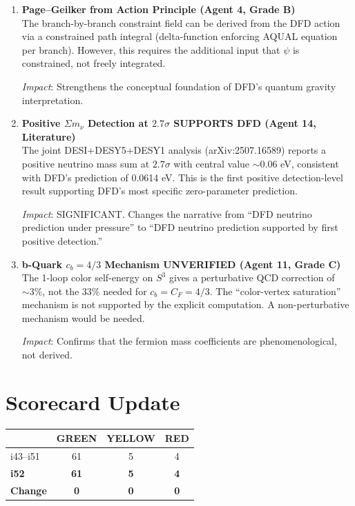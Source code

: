 \documentclass[11pt,a4paper]{article}
\newcommand{\GREEN}{\textcolor{dfdgreen}{\textbf{GREEN}}}
\newcommand{\YELLOW}{\textcolor{dfdyellow}{\textbf{YELLOW}}}
\newcommand{\RED}{\textcolor{dfdred}{\textbf{RED}}}
\begin{document}
\begin{enumerate}[label=\textbf{\arabic*.}, leftmargin=1.5cm]
\textit{Impact}: If SO confirms $\beta \neq 0$ at $>5\sigma$, the DFD microsector requires modification. Core theory unaffected.

\item \textbf{Page--Geilker from Action Principle (Agent 4, Grade B)}\\
The branch-by-branch constraint field can be derived from the DFD action via a constrained path integral (delta-function enforcing AQUAL equation per branch). However, this requires the additional input that $\psi$ is constrained, not freely integrated.

\textit{Impact}: Strengthens the conceptual foundation of DFD's quantum gravity interpretation.

\item \textbf{Positive $\Sigma m_\nu$ Detection at $2.7\sigma$ SUPPORTS DFD (Agent 14, Literature)}\\
The joint DESI+DESY5+DESY1 analysis (arXiv:2507.16589) reports a positive neutrino mass sum at $2.7\sigma$ with central value $\sim 0.06$ eV, consistent with DFD's prediction of 0.0614 eV. This is the first positive detection-level result supporting DFD's most specific zero-parameter prediction.

\textit{Impact}: SIGNIFICANT. Changes the narrative from ``DFD neutrino prediction under pressure'' to ``DFD neutrino prediction supported by first positive detection.''

\item \textbf{b-Quark $c_b = 4/3$ Mechanism UNVERIFIED (Agent 11, Grade C)}\\
The 1-loop color self-energy on $S^3$ gives a perturbative QCD correction of $\sim 3\%$, not the $33\%$ needed for $c_b = C_F = 4/3$. The ``color-vertex saturation'' mechanism is not supported by the explicit computation. A non-perturbative mechanism would be needed.

\textit{Impact}: Confirms that the fermion mass coefficients are phenomenological, not derived.
\end{enumerate}


\section{Scorecard Update}

\begin{center}
\begin{tabular}{lccc}
\toprule
& \textbf{\GREEN} & \textbf{\YELLOW} & \textbf{\RED} \\
\midrule
i43--i51 & 61 & 5 & 4 \\
\textbf{i52} & \textbf{61} & \textbf{5} & \textbf{4} \\
\textbf{Change} & \textbf{0} & \textbf{0} & \textbf{0} \\
\bottomrule
\end{tabular}
\end{center}
\end{document}
